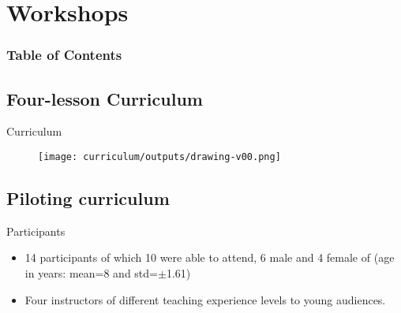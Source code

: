 \section{Workshops}


\begin{frame}
      \frametitle{Table of Contents}
      \tableofcontents[currentsection]
\end{frame}




\subsection{Four-lesson Curriculum}

{

\begin{frame}{Curriculum}
      \begin{figure}
        \centering
        \texttt{[image: curriculum/outputs/drawing-v00.png]}
      \end{figure}
\end{frame}
}


\subsection{Piloting curriculum}



{

\begin{frame}{Participants}

\begin{itemize}
\item 14 participants of which 10 were able to attend, 6 male and 4 female of (age in years: mean=8 and std=$\pm$1.61)     
\item Four instructors of different teaching experience levels to young audiences.
\end{itemize}

\end{frame}
}




